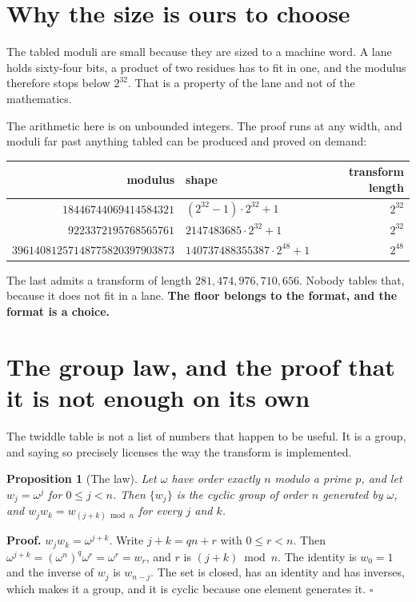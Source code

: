 \documentclass{article}
\newtheorem{proposition}{Proposition}
\begin{document}
\section{Why the size is ours to choose}

The tabled moduli are small because they are sized to a machine word. A lane holds sixty-four bits, a product of two residues has to fit in one, and the modulus therefore stops below \(2^{32}\). That is a property of the lane and not of the mathematics.

The arithmetic here is on unbounded integers. The proof runs at any width, and moduli far past anything tabled can be produced and proved on demand:

\begin{center}
\begin{tabular}{@{}rlr@{}}
\toprule
modulus & shape & transform length \\
\midrule
\(18446744069414584321\) & \((2^{32}-1) \cdot 2^{32} + 1\) & \(2^{32}\) \\
\(9223372195768565761\) & \(2147483685 \cdot 2^{32} + 1\) & \(2^{32}\) \\
\(39614081257148775820397903873\) & \(140737488355387 \cdot 2^{48} + 1\) & \(2^{48}\) \\
\bottomrule
\end{tabular}
\end{center}

The last admits a transform of length \(281{,}474{,}976{,}710{,}656\). Nobody tables that, because it does not fit in a lane. \textbf{The floor belongs to the format, and the format is a choice.}

\section{The group law, and the proof that it is not enough on its own}

The twiddle table is not a list of numbers that happen to be useful. It is a group, and saying so precisely licenses the way the transform is implemented.

\begin{proposition}[The law]
Let \(\omega\) have order exactly \(n\) modulo a prime \(p\), and let \(w_j = \omega^j\) for \(0 \le j < n\). Then \(\{w_j\}\) is the cyclic group of order \(n\) generated by \(\omega\), and \(w_j w_k = w_{(j+k) \bmod n}\) for every \(j\) and \(k\).
\end{proposition}

\textbf{Proof.} \(w_j w_k = \omega^{j+k}\). Write \(j + k = qn + r\) with \(0 \le r < n\). Then \(\omega^{j+k} = (\omega^n)^q \omega^r = \omega^r = w_r\), and \(r\) is \((j+k) \bmod n\). The identity is \(w_0 = 1\) and the inverse of \(w_j\) is \(w_{n-j}\). The set is closed, has an identity and has inverses, which makes it a group, and it is cyclic because one element generates it. \(\square\)
\end{document}
